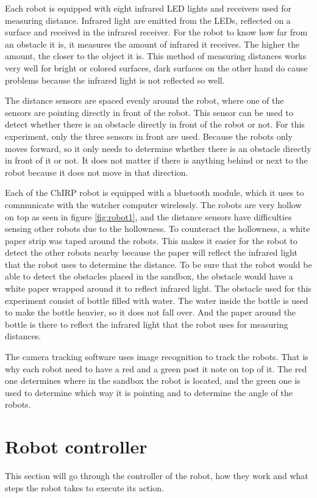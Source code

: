 Each robot is equipped with eight infrared LED lights and receivers used for measuring distance. Infrared light are emitted from the LEDs, reflected on a surface and received in the infrared receiver. For the robot to know how far from an obstacle it is, it measures the amount of infrared it receives. The higher the amount, the closer to the object it is. This method of measuring distances works very well for bright or colored surfaces, dark surfaces on the other hand do cause problems because the infrared light is not reflected so well.

The distance sensors are spaced evenly around the robot, where one of the sensors are pointing directly in front of the robot. This sensor can be used to detect whether there is an obstacle directly in front of the robot or not. For this experiment, only the three sensors in front are used. Because the robots only moves forward, so it only needs to determine whether there is an obstacle directly in front of it or not. It does not matter if there is anything behind or next to the robot because it does not move in that direction.

Each of the ChIRP robot is equipped with a bluetooth module, which it uses to communicate with the watcher computer wirelessly. 
The robots are very hollow on top as seen in figure \ref{fig:robot1}, and the distance sensors have difficulties sensing other robots due to the hollowness. To counteract the hollowness, a white paper strip was taped around the robots. This makes it easier for the robot to detect the other robots nearby because the paper will reflect the infrared light that the robot uses to determine the distance. To be sure that the robot would be able to detect the obstacles placed in the sandbox, the obstacle would have a white paper wrapped around it to reflect infrared light. The obstacle used for this experiment consist of bottle filled with water. The water inside the bottle is used to make the bottle heavier, so it does not fall over. And the paper around the bottle is there to reflect the infrared light that the robot uses for measuring distances.

The camera tracking software uses image recognition to track the robots. That is why each robot need to have a red and a green post it note on top of it. The red one determines where in the sandbox the robot is located, and the green one is used to determine which way it is pointing and to determine the angle of the robots.

\section{Robot controller}
This section will go through the controller of the robot, how they work and what steps the robot takes to execute its action.

